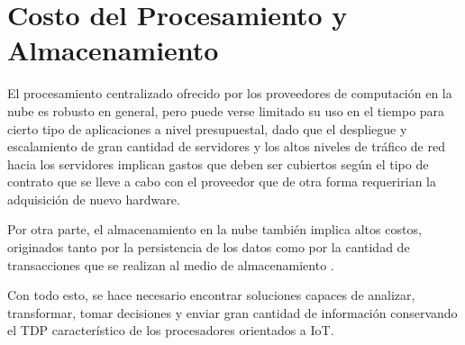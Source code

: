 
\section{Costo del Procesamiento y Almacenamiento}

El procesamiento centralizado ofrecido por los proveedores de computación en la nube es robusto en general, pero puede verse limitado su uso en el tiempo para cierto tipo de aplicaciones a nivel presupuestal, dado que el despliegue y escalamiento de gran cantidad de servidores y los altos niveles de tráfico de red hacia los servidores implican gastos que deben ser cubiertos según el tipo de contrato que se lleve a cabo con el proveedor que de otra forma requeririan la adquisición de nuevo hardware.

Por otra parte, el almacenamiento en la nube también implica altos costos, originados tanto por la persistencia de los datos como por la cantidad de transacciones que se realizan al medio de almacenamiento \citep{AzurePrice,AWSPrice,GCPrice,UPrice}.

Con todo esto, se hace necesario encontrar soluciones capaces de  analizar, transformar, tomar decisiones y enviar gran cantidad de información conservando el TDP característico de los procesadores orientados a IoT.
